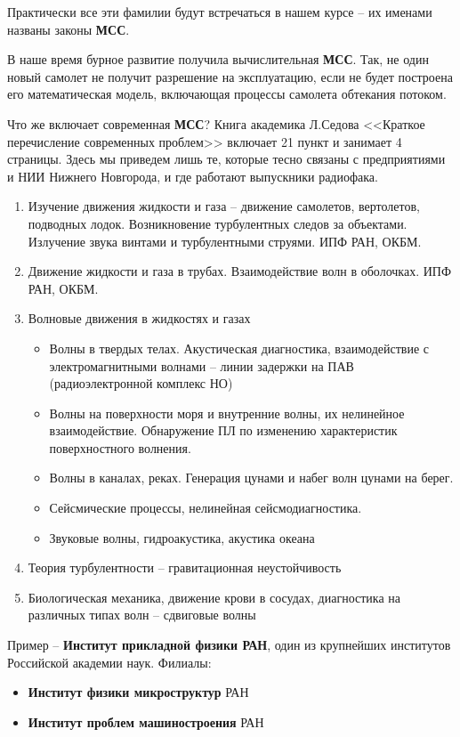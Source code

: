 Практически все эти фамилии будут встречаться в нашем курсе -- их именами названы законы \textbf{МСС}.

В наше время бурное развитие получила вычислительная \textbf{МСС}. Так, не один новый самолет не получит разрешение на эксплуатацию, если не будет построена его математическая модель, включающая процессы самолета  обтекания потоком.

Что же включает современная \textbf{МСС}? Книга академика Л.Седова <<Краткое перечисление современных проблем>> включает 21 пункт и занимает 4 страницы. Здесь мы приведем лишь те, которые тесно связаны с предприятиями и НИИ Нижнего Новгорода, и где работают выпускники радиофака.

\begin{enumerate}
	\item Изучение движения жидкости и газа -- движение самолетов, вертолетов, подводных лодок.  Возникновение турбулентных следов за объектами. Излучение звука винтами и турбулентными струями. ИПФ РАН, ОКБМ.
	\item Движение жидкости и газа в трубах. Взаимодействие волн в оболочках. ИПФ РАН, ОКБМ.
	\item Волновые движения в жидкостях и газах
	\begin{itemize}
		\item Волны в твердых телах.  Акустическая диагностика, взаимодействие с электромагнитными волнами -- линии задержки на ПАВ (радиоэлектронной комплекс НО)
		\item Волны на поверхности моря и внутренние волны, их нелинейное взаимодействие. Обнаружение ПЛ по изменению характеристик поверхностного волнения.
		\item Волны в каналах, реках. Генерация цунами и  набег волн цунами на берег.
		\item Сейсмические процессы, нелинейная сейсмодиагностика.
		\item Звуковые волны,  гидроакустика, акустика океана
	\end{itemize}
	\item Теория турбулентности -- гравитационная неустойчивость
	\item Биологическая механика, движение крови в сосудах, диагностика на различных типах волн -- сдвиговые волны
\end{enumerate}
Пример -- \textbf{Институт прикладной физики РАН}, один из крупнейших институтов Российской академии наук.
Филиалы:
\begin{itemize}
	\item \textbf{Институт физики микроструктур} РАН
	\item \textbf{Институт проблем машиностроения} РАН
\end{itemize}

